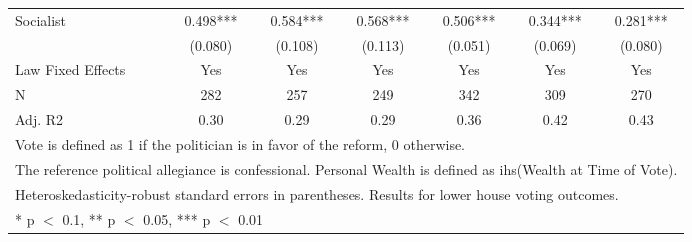 \begin{table}
\begin{tabular}[t]{lcccccc}
Socialist & \num{0.498}*** & \num{0.584}*** & \num{0.568}*** & \num{0.506}*** & \num{0.344}*** & \num{0.281}***\\
 & (\num{0.080}) & (\num{0.108}) & (\num{0.113}) & (\num{0.051}) & (\num{0.069}) & (\num{0.080})\\
\midrule
Law Fixed Effects & Yes & Yes & Yes & Yes & Yes & Yes\\
N & \num{282} & \num{257} & \num{249} & \num{342} & \num{309} & \num{270}\\
Adj. R2 & \num{0.30} & \num{0.29} & \num{0.29} & \num{0.36} & \num{0.42} & \num{0.43}\\
\bottomrule
\multicolumn{7}{l}{\rule{0pt}{1em}Vote is defined as 1 if the politician is in favor of the reform, 0 otherwise.}\\
\multicolumn{7}{l}{\rule{0pt}{1em}The reference political allegiance is confessional. Personal Wealth is defined as ihs(Wealth at Time of Vote).}\\
\multicolumn{7}{l}{\rule{0pt}{1em}Heteroskedasticity-robust standard errors in parentheses. Results for lower house voting outcomes.}\\
\multicolumn{7}{l}{\rule{0pt}{1em}* p $<$ 0.1, ** p $<$ 0.05, *** p $<$ 0.01}\\
\end{tabular}
\end{table}
